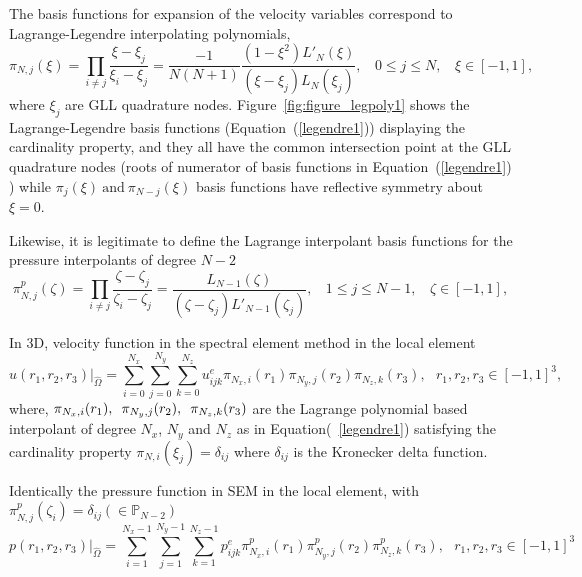 \documentclass[times]{fldauth}
\begin{document}
\begin{appendices}
\begin{figure}
\end{figure}
The basis functions for expansion of the velocity variables correspond to Lagrange-Legendre interpolating polynomials,
\begin{equation}
\pi_{N,j}(\xi) = \prod_{i\neq j}\frac{\xi - \xi_j}{\xi_i - \xi_j} =  \frac{-1}{N(N+1)}\frac{(1-\xi^{2})L'_{N}(\xi)}{(\xi - \xi_j)L_N(\xi_j)}, \ \  \  \   0 \leq j \leq N, \  \  \ \  \xi \in [-1,1],  \label{legendre1}
\end{equation}
where $\xi_j$ are GLL quadrature nodes. Figure~\ref{fig:figure_legpoly1} shows the Lagrange-Legendre basis functions (Equation~(\ref{legendre1})) displaying the cardinality property, and they all have the common intersection point at the GLL quadrature nodes (roots of numerator of basis functions in Equation~(\ref{legendre1}) ) while $\pi_{j}(\xi) \ \mbox{and} \ \pi_{N-j}(\xi)$ basis functions have reflective symmetry about $\xi = 0$.

Likewise, it is legitimate to define the Lagrange interpolant basis functions for the pressure interpolants of degree $N-2$
\begin{equation}
\pi^{p}_{N,j}(\zeta) = \prod_{i\neq j}\frac{\zeta - \zeta_j}{\zeta_i - \zeta_j} = \frac{L_{N-1}(\zeta)}{(\zeta - \zeta_j)L'_{N-1}(\zeta_j)} , \ \  \  \   1 \leq j \leq N-1, \  \  \ \  \zeta \in [-1,1],  \label{legendre1}
\end{equation} 
\par

In 3D, velocity function in the spectral element method in the local element
\begin{equation}
u(r_1,r_2,r_3)|_{\hat{\Omega}} = \displaystyle\sum_{i=0}^{N_x}\sum_{j=0}^{N_y}\sum_{k=0}^{N_z}u_{ijk}^{e}\pi_{N_x,i}({r_1})\pi_{N_y,j}({r_2})\pi_{N_z,k}({r_3}),  \ \ \ {r_1},{r_2},{r_3}\in [-1,1]^3,
\end{equation}
where, $\pi_{N_x,i}(r_1),\hspace{0.5em} \pi_{N_y,j}(r_2), \hspace{0.5em}\pi_{N_z,k}(r_3)$ are the Lagrange polynomial based interpolant of degree $N_x$, $N_y$ and $N_z$ as in Equation(~\ref{legendre1}) satisfying the cardinality property $\pi_{N,i}(\xi_{j}) = \delta_{ij}$ where $\delta_{ij}$ is the Kronecker delta function.
 
Identically the pressure function in SEM in the local element, with $\pi^{p}_{N,j}({\zeta_i}) = \delta_{ij} (\in \mathbb{P}_{N-2})$
\begin{equation}
p(r_1,r_2,r_3)|_{\hat{\Omega}} = \displaystyle\sum_{i=1}^{N_x-1}\sum_{j=1}^{N_y-1}\sum_{k=1}^{N_z-1}p_{ijk}^{e}\pi^{p}_{N_x,i}({r_1})\pi^{p}_{N_y,j}({r_2})\pi^{p}_{N_z,k}({r_3}),  \ \ \ {r_1},{r_2},{r_3}\in [-1,1]^3
\end{equation}

\end{appendices} 
 
\end{document}
